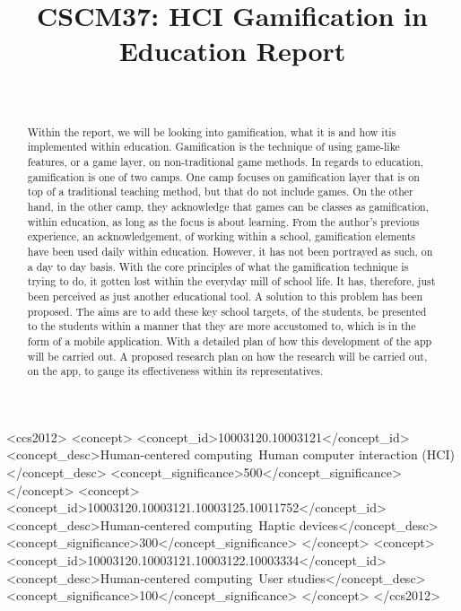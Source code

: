 \documentclass{sigchi}
\def\plaintitle{CSCM37: HCI Gamification in Education Report}
\begin{document}
\title{\plaintitle}

\author{%
  \\
}

\maketitle


\begin{abstract}
  Within the report, we will be looking into gamification, what it is and how itis implemented within education. Gamification is the technique of using game-like features, or a game layer, on non-traditional game methods. In regards to education,  gamification is one of two camps. One camp focuses on gamification layer that is on top of a traditional teaching method, but that do not include games.  On the other hand, in the other camp, they acknowledge that games can be classes as gamification, within education, as long as the focus is about learning. From the author's previous experience, an acknowledgement, of working within a school, gamification elements have been used daily within education. However, it has not been portrayed as such, on a day to day basis. With the core principles of what the gamification technique is trying to do, it gotten lost within the everyday mill of school life. It has, therefore, just been perceived as just another educational tool. A solution to this problem has been proposed. The aims are to add these key school targets, of the students, be presented to the students within a manner that they are more accustomed to, which is in the form of a mobile application. With a detailed plan of how this development of the app will be carried out. A proposed research plan on how the research will be carried out, on the app, to gauge its effectiveness within its representatives. 
\end{abstract}



\begin{CCSXML}
<ccs2012>
<concept>
<concept_id>10003120.10003121</concept_id>
<concept_desc>Human-centered computing~Human computer interaction (HCI)</concept_desc>
<concept_significance>500</concept_significance>
</concept>
<concept>
<concept_id>10003120.10003121.10003125.10011752</concept_id>
<concept_desc>Human-centered computing~Haptic devices</concept_desc>
<concept_significance>300</concept_significance>
</concept>
<concept>
<concept_id>10003120.10003121.10003122.10003334</concept_id>
<concept_desc>Human-centered computing~User studies</concept_desc>
<concept_significance>100</concept_significance>
</concept>
</ccs2012>
\end{CCSXML}
\end{document}
